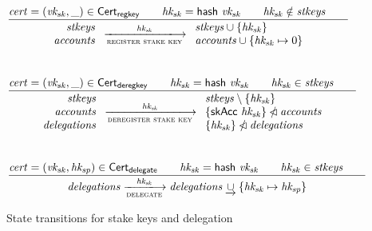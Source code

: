\documentclass[11pt,a4paper]{article}
\newcommand{\restrictdom}{\lhd}
\newcommand{\subtractdom}{\mathbin{\slashed{\restrictdom}}}
\newcommand{\union}{\cup}
\newcommand{\unionoverride}{\mathbin{\underrightarrow\cup}}
\newcommand{\var}[1]{\mathit{#1}}
\newcommand{\fun}[1]{\mathsf{#1}}
\newcommand{\type}[1]{\mathsf{#1}}
\newcommand{\transitionarrow}[2]{\xlongrightarrow[\textsc{#1}]{#2}}
\begin{document}
\begin{figure}
\begin{equation*}
\frac{
  \var{cert} = (\var{vk_{sk}}, \_)\in \type{Cert_{regkey}} \qquad
  \var{hk_{sk}} = \fun{hash} ~ \var{vk_{sk}} \qquad
  \var{hk_{sk}} \notin \var{stkeys} \qquad
}{
  \begin{array}{r}
    \var{stkeys} \\
    \var{accounts}
  \end{array}
  \transitionarrow{register stake key}{\var{hk_{sk}}}
  \begin{array}{l}
    \var{stkeys} \union \{\var{hk_{sk}}\} \\
    \var{accounts} \union \{\var{hk_{sk}} \mapsto 0\}
  \end{array}
}
\end{equation*}
%
\\[1em]
%
\begin{equation*}
\frac{
  \var{cert} = (\var{vk_{sk}}, \_)\in \type{Cert_{deregkey}} \qquad
  \var{hk_{sk}} = \fun{hash} ~ \var{vk_{sk}} \qquad
  \var{hk_{sk}} \in \var{stkeys} \qquad
}{
  \begin{array}{r}
    \var{stkeys} \\ \var{accounts} \\ \var{delegations}
  \end{array}
  \transitionarrow{deregister stake key}{\var{hk_{sk}}}
  \begin{array}{l}
  \var{stkeys} \setminus \{\var{hk_{sk}}\} \\
  \{\fun{skAcc}~\var{hk_{sk}}\} \subtractdom \var{accounts} \\
  \{\var{hk_{sk}}\} \subtractdom \var{delegations}
  \end{array}
}
\end{equation*}
%
\\[1em]
%
\begin{equation*}
\frac{
  \var{cert} = (\var{vk_{sk}}, \var{hk_{sp}}) \in \type{Cert_{delegate}} \qquad
  \var{hk_{sk}} = \fun{hash} ~ \var{vk_{sk}} \qquad
  \var{hk_{sk}} \in \var{stkeys} \qquad
}{
  \var{delegations}
  \transitionarrow{delegate}{\var{hk_{sk}}}
  \var{delegations} \unionoverride \{\var{hk_{sk}} \mapsto \var{hk_{sp}}\}
}
\end{equation*}

\caption{State transitions for stake keys and delegation}
\label{fig:delegation_transitions}
\end{figure}
\end{document}
